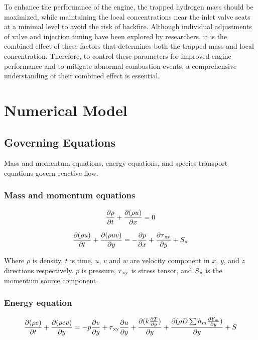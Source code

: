 \documentclass[conference]{IEEEtran}
\begin{document}
To enhance the performance of the engine, the trapped hydrogen mass should be maximized, while maintaining the local concentrations near the inlet valve seats at a minimal level to avoid the risk of backfire. Although individual adjustments of valve and injection timing have been explored by researchers, it is the combined effect of these factors that determines both the trapped mass and local concentration. Therefore, to control these parameters for improved engine performance and to mitigate abnormal combustion events, a comprehensive understanding of their combined effect is essential.


\section{Numerical Model}
\subsection{Governing Equations}
Mass and momentum equations, energy equations, and species transport equations govern reactive flow.

\subsubsection{Mass and momentum equations}

    \begin{gather*}
        \pdv{\rho}{t} + \pdv{(\rho u)}{ x} = 0
    \end{gather*}

    \begin{gather*}
        \pdv{(\rho u)}{t} + \pdv{(\rho uv)}{y} = - \pdv{p}{x} + \pdv{\tau\textsubscript{xy}}{y} + S\textsubscript{x}
    \end{gather*}

Where $\rho$ is density, $t$ is time, $u$, $v$ and $w$ are velocity component in $x$, $y$, and $z$ directions respectively. 
$p$ is pressure, $\tau\textsubscript{xy}$ is stress tensor, and $S\textsubscript{x}$ is the momentum source component.\\

\subsubsection{Energy equation}

    \begin{gather*}
        \pdv{(\rho e)}{t} + \pdv{(\rho ev)}{y} = -p \pdv{v}{y} + \tau \textsubscript{xy} \pdv{u}{y} + \pdv{(k \pdv{T}{y})}{y} + \pdv{(\rho D \sum h_m \pdv{Y_m}{y})}{y} + S
    \end{gather*}
\end{document}
